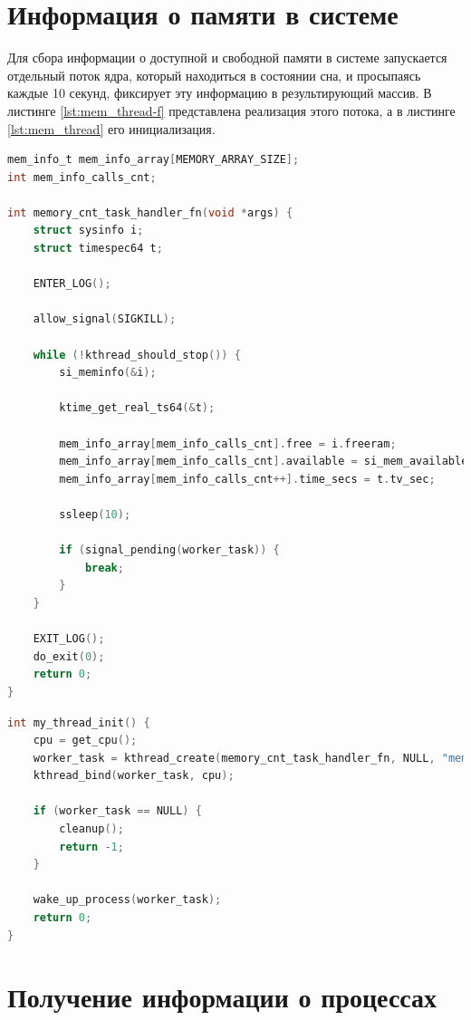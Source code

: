 \section{Информация о памяти в системе}

Для сбора информации о доступной и свободной памяти в системе запускается отдельный поток ядра, который находиться в состоянии сна, и просыпаясь каждые 10 секунд, фиксирует эту информацию в результирующий массив. В листинге \ref{lst:mem_thread-f} представлена реализация этого потока, а в листинге \ref{lst:mem_thread} его инициализация.\\

\begin{lstlisting}[label=lst:mem_thread-f, caption=Реализация функции сохраняющей информацию о доступной в системе памяти, language=c]
mem_info_t mem_info_array[MEMORY_ARRAY_SIZE];
int mem_info_calls_cnt;

int memory_cnt_task_handler_fn(void *args) {
	struct sysinfo i;
	struct timespec64 t;
	
	ENTER_LOG();
	
	allow_signal(SIGKILL);
	
	while (!kthread_should_stop()) {
		si_meminfo(&i);
		
		ktime_get_real_ts64(&t);
		
		mem_info_array[mem_info_calls_cnt].free = i.freeram;
		mem_info_array[mem_info_calls_cnt].available = si_mem_available();
		mem_info_array[mem_info_calls_cnt++].time_secs = t.tv_sec;
		
		ssleep(10);
		
		if (signal_pending(worker_task)) {
			break;
		}
	}
	
	EXIT_LOG();
	do_exit(0);
	return 0;
}
\end{lstlisting}

\begin{lstlisting}[label=lst:mem_thread, caption=Функция инициализации потока ядра, language=c]
int my_thread_init() {
	cpu = get_cpu();
	worker_task = kthread_create(memory_cnt_task_handler_fn, NULL, "memory counter thread");
	kthread_bind(worker_task, cpu);
	
	if (worker_task == NULL) {
		cleanup();
		return -1;
	}
	
	wake_up_process(worker_task);
	return 0;
}
\end{lstlisting}

\section{Получение информации о процессах}

